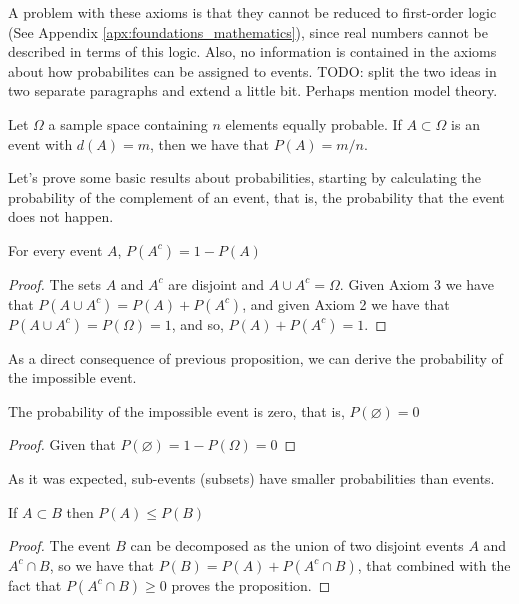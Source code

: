 A problem with these axioms is that they cannot be reduced to first-order logic (See Appendix \ref{apx:foundations_mathematics}), since real numbers cannot be described in terms of this logic. Also, no information is contained in the axioms about how probabilites can be assigned to events. {\color{red} TODO: split the two ideas in two separate paragraphs and extend a little bit. Perhaps mention model theory.}

\begin{example}
\label{ex:discrete_sample_space}
Let $\Omega$ a sample space containing $n$ elements equally probable. If $A \subset \Omega$ is an event with $d(A) = m$, then we have that $P(A) = m/n$.
\end{example}

Let's prove some basic results about probabilities, starting by calculating the probability of the complement of an event, that is, the probability that the event does not happen.

\begin{proposition}
For every event $A$, $P \left( A^{c} \right) = 1 - P \left( A \right)$
\end{proposition}
\begin{proof}
The sets $A$ and $A^c$ are disjoint and $A \cup A^c = \Omega$. Given Axiom 3 we have that $P \left( A \cup A^c \right) = P \left( A \right) + P \left( A^c \right)$, and given Axiom 2 we have that $P \left( A \cup A^c \right) = P(\Omega) = 1$, and so, $P \left( A \right) + P \left( A^c \right) = 1$.
\end{proof}

As a direct consequence of previous proposition, we can derive the probability of the impossible event.

\begin{proposition}
The probability of the impossible event is zero, that is, $P \left( \varnothing \right) = 0$
\end{proposition}
\begin{proof}
Given that $P \left( \varnothing \right) = 1 - P \left( \Omega \right) = 0$
\end{proof}

As it was expected, sub-events (subsets) have smaller probabilities than events.

\begin{proposition}
If $A\subset B$ then $P \left( A \right) \leq P \left( B \right)$
\end{proposition}
\begin{proof}
The event $B$ can be decomposed as the union of two disjoint events $A$ and $A^c \cap B$, so we have that $P \left( B \right) = P \left( A \right) + P \left( A^c \cap B \right)$, that combined with the fact that  $P \left( A^c \cap B \right) \geq 0$ proves the proposition.
\end{proof}

